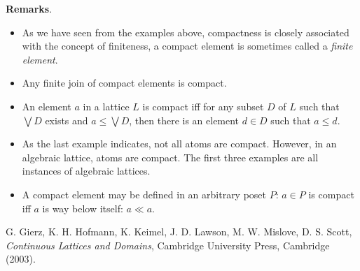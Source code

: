 \documentclass[12pt]{article}
\begin{document}
\textbf{Remarks}.
\begin{itemize}
\item As we have seen from the examples above, compactness is closely associated with the concept of finiteness, a compact element is sometimes called a \emph{finite element}.
\item Any finite join of compact elements is compact.
\item An element $a$ in a lattice $L$ is compact iff for any  subset $D$ of $L$ such that $\bigvee D$ exists and $a\le \bigvee D$, then there is an element $d\in D$ such that $a\le d$.
\item As the last example indicates, not all atoms are compact.  However, in an algebraic lattice, atoms are compact.  The first three examples are all instances of algebraic lattices.
\item A compact element may be defined in an arbitrary poset $P$: $a\in P$ is compact iff $a$ is way below itself: $a\ll a$.
\end{itemize}

\begin{thebibliography}{8}
 G. Gierz, K. H. Hofmann, K. Keimel, J. D. Lawson, M. W. Mislove, D. S. Scott, {\em Continuous Lattices and Domains}, Cambridge University Press, Cambridge (2003).
\end{thebibliography}
\end{document}
